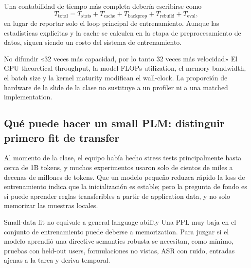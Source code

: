 
Una contabilidad de tiempo más completa debería escribirse como
\[
T_{\text{total}}=T_{\text{stats}}+T_{\text{cache}}
+T_{\text{backprop}}+T_{\text{rebuild}}+T_{\text{eval}},
\]
en lugar de reportar solo el loop principal de entrenamiento. Aunque las estadísticas explícitas y la cache se calculen en la etapa de preprocesamiento de datos, siguen siendo un costo del sistema de entrenamiento.

\begin{warningbox}{No difundir «32 veces más capacidad, por lo tanto 32 veces más velocidad»}
El GPU theoretical throughput, la model FLOPs utilization, el memory bandwidth, el batch size y la kernel maturity modifican el wall-clock. La proporción de hardware de la slide de la clase no sustituye a un profiler ni a una matched implementation.
\end{warningbox}


\subsection{Qué puede hacer un small PLM: distinguir primero fit de transfer}

Al momento de la clase, el equipo había hecho stress tests principalmente hasta cerca de 1B tokens, y muchos experimentos usaron solo de cientos de miles a decenas de millones de tokens. Que un modelo pequeño reduzca rápido la loss de entrenamiento indica que la inicialización es estable; pero la pregunta de fondo es si puede aprender reglas transferibles a partir de application data, y no solo memorizar las muestras locales.


\begin{warningbox}{Small-data fit no equivale a general language ability}
Una PPL muy baja en el conjunto de entrenamiento puede deberse a memorization. Para juzgar si el modelo aprendió una directive semantics robusta se necesitan, como mínimo, pruebas con held-out users, formulaciones no vistas, ASR con ruido, entradas ajenas a la tarea y deriva temporal.
\end{warningbox}

